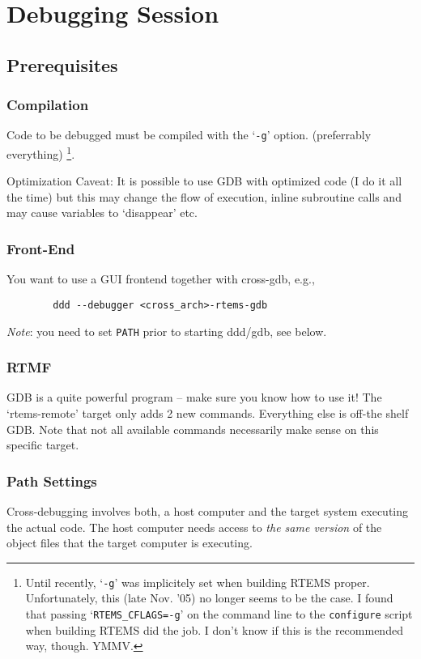 \documentclass{article}
\newcommand{\cmd}[1]{{\tt #1}}
\begin{document}
\section{Debugging Session}

\subsection{Prerequisites}
\subsubsection*{Compilation}
	Code to be debugged must be compiled with the `{\tt -g}' option.
    (preferrably everything)%
\footnote{Until recently, `{\tt -g}' was implicitely set when building
RTEMS proper. Unfortunately, this (late Nov. '05) no longer seems to be
the case. I found that passing `\mbox{\tt RTEMS\_CFLAGS=-g}' on the command
line to the \cmd{configure} script when building RTEMS did the job. I
don't know if this is the recommended way, though. YMMV.
}.

	Optimization Caveat: It is possible to use GDB with optimized
	code (I do it all the time) but this may change the flow
	of execution, inline subroutine calls and may cause
	variables to `disappear' etc.

\subsubsection*{Front-End}
	You want to use a GUI frontend together with cross-gdb, e.g.,
\begin{verbatim}
		ddd --debugger <cross_arch>-rtems-gdb
\end{verbatim}

	{\em Note\/}: you need to set {\tt PATH} prior to starting ddd/gdb,
    see below.  

\subsubsection*{RTMF}
	GDB is a quite powerful program -- make sure you know how to
	use it! The `rtems-remote' target only adds 2 new commands.
	Everything else is off-the shelf GDB.
	Note that not all available commands necessarily make sense
	on this specific target.

\subsubsection*{Path Settings}
    Cross-debugging involves both, a host computer and the
    target system executing the actual code. The host computer
    needs access to {\em the same version} of the object files
	that the target computer is executing.
\end{document}
